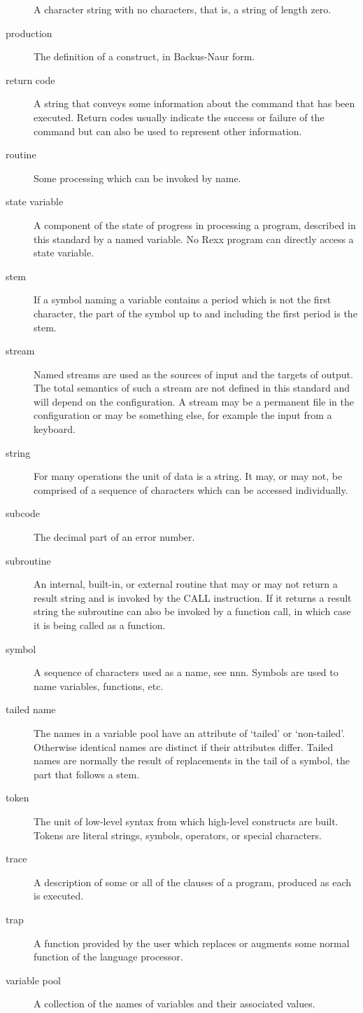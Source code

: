 \begin{description}
A character string with no characters, that is, a string of length zero.
\item[production]
The definition of a construct, in Backus-Naur form.
\item[return code]
A string that conveys some information about the command that has been
executed. Return codes usually indicate the success or failure of the
command but can also be used to represent other information.
\item[routine]
Some processing which can be invoked by name.
\item[state variable]
A component of the state of progress in processing a program, described
in this standard by a named variable. No Rexx program can directly
access a state variable.
\item[stem]
If a symbol naming a variable contains a period which is not the first
character, the part of the symbol up to and including the first period
is the stem.
\item[stream]
Named streams are used as the sources of input and the targets of
output. The total semantics of such a stream are not defined in this
standard and will depend on the configuration. A stream may be a
permanent file in the configuration or may be something else, for
example the input from a keyboard.
\item[string]
For many operations the unit of data is a string. It may, or may not, be
comprised of a sequence of characters which can be accessed
individually.
\item[subcode]
The decimal part of an error number.
\item[subroutine]
An internal, built-in, or external routine that may or may not return a
result string and is invoked by the CALL instruction. If it returns a
result string the subroutine can also be invoked by a function call, in
which case it is being called as a function.
\item[symbol]
A sequence of characters used as a name, see nnn. Symbols are used to
name variables, functions, etc.
\item[tailed name]
The names in a variable pool have an attribute of `tailed' or
`non-tailed'. Otherwise identical names are distinct if their attributes
differ. Tailed names are normally the result of replacements in the tail
of a symbol, the part that follows a stem.
\item[token]
The unit of low-level syntax from which high-level constructs are built.
Tokens are literal strings, symbols, operators, or special characters.
\item[trace]
A description of some or all of the clauses of a program, produced as
each is executed.
\item[trap]
A function provided by the user which replaces or augments some normal
function of the language processor.
\item[variable pool]
A collection of the names of variables and their associated values.
\end{description}


